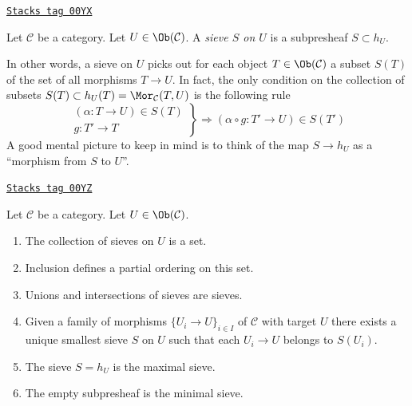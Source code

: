 \begin{definition}[Sieve]
\label{sites-definition-sieve}
\href{https://stacks.math.columbia.edu/tag/00YX}{\texttt{Stacks tag 00YX}}

Let $\mathcal{C}$ be a category. Let $U \in \Ob(\mathcal{C})$.
A {\it sieve $S$ on $U$} is a subpresheaf $S \subset h_U$.
\end{definition}

In other words, a sieve on $U$ picks out for each object
$T \in \Ob(\mathcal{C})$ a subset $S(T)$ of the set
of all morphisms $T \to U$. In fact, the only condition
on the collection of subsets
$S(T) \subset h_U(T) = \Mor_\mathcal{C}(T, U)$
is the following rule
\begin{equation}
\label{equation-property-sieve}
\left.
\begin{matrix}
(\alpha : T \to U) \in S(T) \\
g : T' \to T
\end{matrix}
\right\} \Rightarrow
(\alpha \circ g : T' \to U) \in S(T')
\end{equation}
A good mental picture to keep in mind is to think of the
map $S \to h_U$ as a ``morphism from $S$ to $U$''.

\begin{lemma}
\label{sites-lemma-sieves-set}
\href{https://stacks.math.columbia.edu/tag/00YZ}{\texttt{Stacks tag 00YZ}}

Let $\mathcal{C}$ be a category. Let $U \in \Ob(\mathcal{C})$.
\begin{enumerate}
\item The collection of sieves on $U$ is a set.
\item Inclusion defines a partial ordering on this set.
\item Unions and intersections of sieves are sieves.
\item
\label{sites-item-sieve-generated}
Given a family of morphisms $\{U_i \to U\}_{i\in I}$
of $\mathcal{C}$ with target $U$
there exists a unique smallest sieve $S$ on $U$ such that
each $U_i \to U$ belongs to $S(U_i)$.
\item The sieve $S = h_U$ is the maximal sieve.
\item The empty subpresheaf is the minimal sieve.
\end{enumerate}
\end{lemma}

